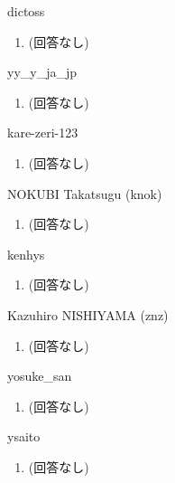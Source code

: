 \begin{prework}{ dictoss }
  \begin{enumerate}
  \item (回答なし)
  \end{enumerate}
\end{prework}

\begin{prework}{ yy\_y\_ja\_jp }
  \begin{enumerate}
  \item (回答なし)
  \end{enumerate}
\end{prework}

\begin{prework}{ kare-zeri-123 }
  \begin{enumerate}
  \item (回答なし)
  \end{enumerate}
\end{prework}

\begin{prework}{ NOKUBI Takatsugu (knok) }
  \begin{enumerate}
  \item (回答なし)
  \end{enumerate}
\end{prework}

\begin{prework}{ kenhys }
  \begin{enumerate}
  \item (回答なし)
  \end{enumerate}
\end{prework}

\begin{prework}{ Kazuhiro NISHIYAMA (znz) }
  \begin{enumerate}
  \item (回答なし)
  \end{enumerate}
\end{prework}

\begin{prework}{ yosuke\_san }
  \begin{enumerate}
  \item (回答なし)
  \end{enumerate}
\end{prework}

\begin{prework}{ ysaito }
  \begin{enumerate}
  \item (回答なし)
  \end{enumerate}
\end{prework}

